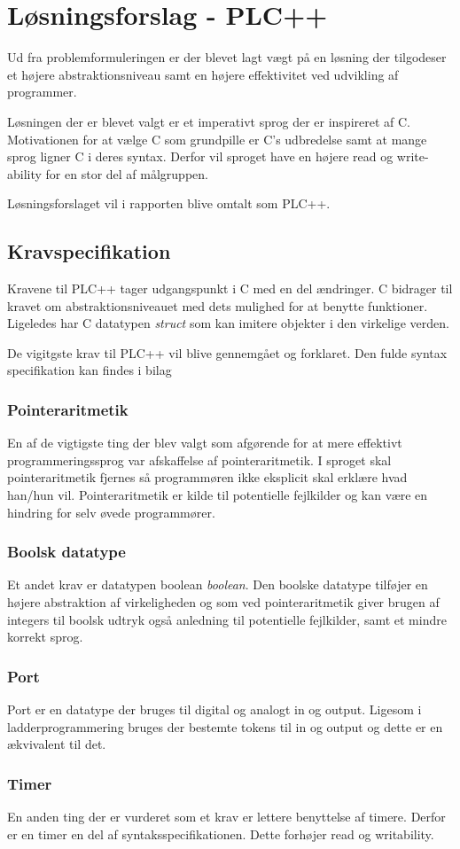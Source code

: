 \section{Løsningsforslag - PLC++}
Ud fra problemformuleringen er der blevet lagt vægt på en løsning der tilgodeser et højere abstraktionsniveau samt en højere effektivitet ved udvikling af programmer.

Løsningen der er blevet valgt er et imperativt sprog der er inspireret af C. Motivationen for at vælge C som grundpille er C's udbredelse samt at mange sprog ligner C i deres syntax. Derfor vil sproget have en højere read og write-ability for en stor del af målgruppen.

Løsningsforslaget vil i rapporten blive omtalt som PLC++.

\subsection{Kravspecifikation}
Kravene til PLC++ tager udgangspunkt i C med en del ændringer. C bidrager til kravet om abstraktionsniveauet med dets mulighed for at benytte funktioner. Ligeledes har C datatypen \textit{struct} som kan imitere objekter i den virkelige verden.

De vigitgste krav til PLC++ vil blive gennemgået og forklaret. Den fulde syntax specifikation kan findes i bilag 

\subsubsection{Pointeraritmetik}
En af de vigtigste ting der blev valgt som afgørende for at mere effektivt programmeringssprog var afskaffelse af pointeraritmetik. I sproget skal pointeraritmetik fjernes så programmøren ikke eksplicit skal erklære hvad han/hun vil. Pointeraritmetik er kilde til potentielle fejlkilder og kan være en hindring for selv øvede programmører.

\subsubsection{Boolsk datatype}
Et andet krav er datatypen boolean \textit{boolean}. Den boolske datatype tilføjer en højere abstraktion af virkeligheden og som ved pointeraritmetik giver brugen af integers til boolsk udtryk også anledning til potentielle fejlkilder, samt et mindre korrekt sprog.

\subsubsection{Port}
Port er en datatype der bruges til digital og analogt in og output. Ligesom i ladderprogrammering bruges der bestemte tokens til in og output og dette er en ækvivalent til det.

\subsubsection{Timer}
En anden ting der er vurderet som et krav er lettere benyttelse af timere. Derfor er en timer en del af syntaksspecifikationen. Dette forhøjer read og writability.